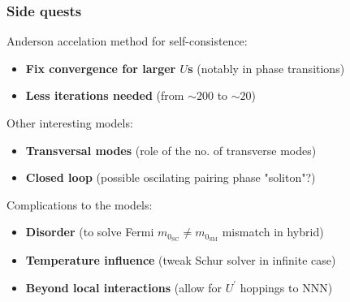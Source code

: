\documentclass{beamer}
\begin{document}
\begin{frame}
\frametitle{Side quests}

\begin{exampleblock}{Anderson accelation method for self-consistence:}
\begin{itemize}
\item \textcolor{ForestGreen!80!black}{\textbf{Fix convergence for larger $U$s} (notably in phase transitions)}
\item \textcolor{ForestGreen!80!black}{\textbf{Less iterations needed} (from $\sim 200$ to $\sim 20$)}
\end{itemize}
\end{exampleblock}
\pause

\begin{alertblock}{Other interesting models:}
\begin{itemize}
\item \textcolor{orange!95!black}{\textbf{Transversal modes} (role of the no. of transverse modes)}
\item \textcolor{orange!95!black}{\textbf{Closed loop} (possible oscilating pairing phase "soliton"?)}
\end{itemize}
\end{alertblock}
\pause

\begin{block}{Complications to the models:}
\begin{itemize}
\item \textcolor{red!80!black}{\textbf{Disorder} (to solve Fermi $m_{0_\text{SC}}\neq m_{0_\text{SM}}$ mismatch in hybrid)}
\item \textcolor{red!80!black}{\textbf{Temperature influence} (tweak Schur solver in infinite case)}
\item \textcolor{red!80!black}{\textbf{Beyond local interactions} (allow for $U^\prime$ hoppings to NNN)}
\end{itemize}
\end{block}
\end{frame}
\end{document}
